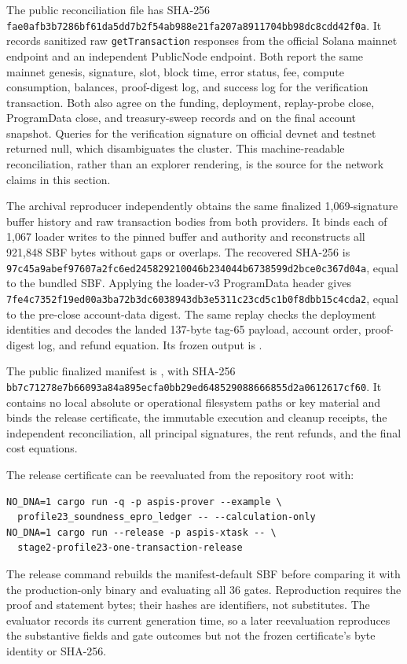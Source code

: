 The public reconciliation file
has SHA-256
\nolinkurl{fae0afb3b7286bf61da5dd7b2f54ab988e21fa207a8911704bb98dc8cdd42f0a}.
It records sanitized raw \texttt{getTransaction} responses from the official
Solana mainnet endpoint and an independent PublicNode endpoint.  Both report
the same mainnet genesis, signature, slot, block time, error status, fee,
compute consumption, balances, proof-digest log, and success log for the
verification transaction.  Both also agree on the funding, deployment,
replay-probe close, ProgramData close, and treasury-sweep records and on the
final account snapshot.  Queries for the verification signature on official
devnet and testnet returned null, which disambiguates the cluster.  This
machine-readable reconciliation, rather than an explorer rendering, is the
source for the network claims in this section.

The archival reproducer
 independently obtains the
same finalized 1,069-signature buffer history and raw transaction bodies from
both providers.  It binds each of 1,067 loader writes to the pinned buffer and
authority and reconstructs all 921,848 SBF bytes without gaps or overlaps.
The recovered SHA-256 is
\nolinkurl{97c45a9abef97607a2fc6ed245829210046b234044b6738599d2bce0c367d04a},
equal to the bundled SBF.  Applying the loader-v3 ProgramData header gives
\nolinkurl{7fe4c7352f19ed00a3ba72b3dc6038943db3e5311c23cd5c1b0f8dbb15c4cda2},
equal to the pre-close account-data digest.  The same replay checks the
deployment identities and decodes the landed 137-byte tag-65 payload, account
order, proof-digest log, and refund equation.  Its frozen output is
.

The public finalized manifest is
, with SHA-256
\nolinkurl{bb7c71278e7b66093a84a895ecfa0bb29ed648529088666855d2a0612617cf60}.
It contains no local absolute or operational filesystem paths or key material
and binds the release certificate,
the immutable execution and cleanup receipts, the independent reconciliation,
all principal signatures, the rent refunds, and the final cost equations.

The release certificate can be reevaluated from the repository root with:
\begin{verbatim}
NO_DNA=1 cargo run -q -p aspis-prover --example \
  profile23_soundness_epro_ledger -- --calculation-only
NO_DNA=1 cargo run --release -p aspis-xtask -- \
  stage2-profile23-one-transaction-release
\end{verbatim}
The release command rebuilds the manifest-default SBF before comparing it
with the production-only binary and evaluating all 36 gates.  Reproduction
requires the proof and statement bytes; their hashes are identifiers, not
substitutes.  The evaluator records its current generation time, so a later
reevaluation reproduces the substantive fields and gate outcomes but not the
frozen certificate's byte identity or SHA-256.
